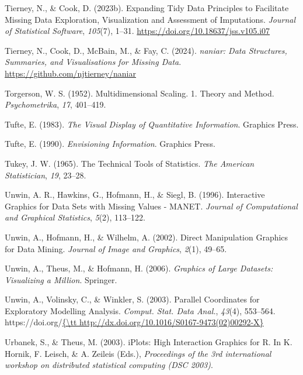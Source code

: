 \documentclass[
  letterpaper,
]{krantz}
\newlength{\cslhangindent}
\newenvironment{CSLReferences}[2] %
 {\begin{list}{}{%
  \setlength{\itemindent}{0pt}
  \setlength{\leftmargin}{0pt}
  \setlength{\parsep}{0pt}
  \ifodd #1
   \setlength{\leftmargin}{\cslhangindent}
   \setlength{\itemindent}{-1\cslhangindent}
  \fi
  \setlength{\itemsep}{#2\baselineskip}}}
 {\end{list}}
\begin{document}
\begin{CSLReferences}{1}{0}
Tierney, N., \& Cook, D. (2023b). Expanding {T}idy {D}ata {P}rinciples
to {F}acilitate {M}issing {D}ata {E}xploration, {V}isualization and
{A}ssessment of {I}mputations. \emph{Journal of Statistical Software},
\emph{105}(7), 1--31. \url{https://doi.org/10.18637/jss.v105.i07}

Tierney, N., Cook, D., McBain, M., \& Fay, C. (2024). \emph{{naniar}:
{D}ata {S}tructures, {S}ummaries, and {V}isualisations for {M}issing
{D}ata}. \url{https://github.com/njtierney/naniar}

Torgerson, W. S. (1952). Multidimensional {S}caling. 1. {T}heory and
{M}ethod. \emph{Psychometrika}, \emph{17}, 401--419.

Tufte, E. (1983). \emph{The {V}isual {D}isplay of {Q}uantitative
{I}nformation}. Graphics Press.

Tufte, E. (1990). \emph{Envisioning {I}nformation}. Graphics Press.

Tukey, J. W. (1965). The {T}echnical {T}ools of {S}tatistics. \emph{The
American Statistician}, \emph{19}, 23--28.

Unwin, A. R., Hawkins, G., Hofmann, H., \& Siegl, B. (1996).
{I}nteractive {G}raphics for {D}ata {S}ets with {M}issing {V}alues -
{MANET}. \emph{Journal of Computational and Graphical Statistics},
\emph{5}(2), 113--122.

Unwin, A., Hofmann, H., \& Wilhelm, A. (2002). Direct {M}anipulation
{G}raphics for {D}ata {M}ining. \emph{Journal of Image and Graphics},
\emph{2}(1), 49--65.

Unwin, A., Theus, M., \& Hofmann, H. (2006). \emph{Graphics of {L}arge
{D}atasets: {V}isualizing a {M}illion}. Springer.

Unwin, A., Volinsky, C., \& Winkler, S. (2003). Parallel {C}oordinates
for {E}xploratory {M}odelling {A}nalysis. \emph{Comput. Stat. Data
Anal.}, \emph{43}(4), 553--564.
https://doi.org/\href{\%7B/tt\%20http://dx.doi.org/10.1016/S0167-9473(02)00292-X\%7D}{\{\textbackslash tt
http://dx.doi.org/10.1016/S0167-9473(02)00292-X\}}

Urbanek, S., \& Theus, M. (2003). {iPlots}: {H}igh {I}nteraction
{G}raphics for {R}. In K. Hornik, F. Leisch, \& A. Zeileis (Eds.),
\emph{Proceedings of the 3rd international workshop on distributed
statistical computing (DSC 2003)}.


\end{CSLReferences}
\end{document}
